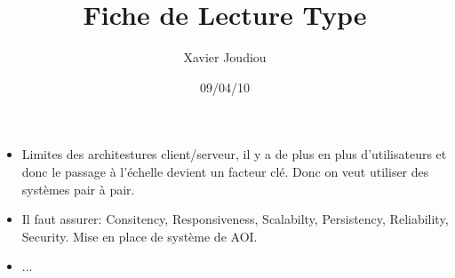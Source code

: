 \documentclass[11pt,a4paper]{article}
\title{Fiche de Lecture Type}
\author{Xavier Joudiou}
\date{09/04/10}
\begin{document}
	
  \begin{itemize}
  \renewcommand{\labelitemi}{$\Rightarrow$}
	\item Limites des architestures client/serveur, il y a de plus en plus d'utilisateurs et donc le passage à l'échelle devient un facteur clé. Donc on veut utiliser des systèmes pair à pair. 
	\item Il faut assurer: Consitency, Responsiveness, Scalabilty, Persistency, Reliability, Security. Mise en place de système de AOI.
	\item ...
  \end{itemize}
\end{document}
